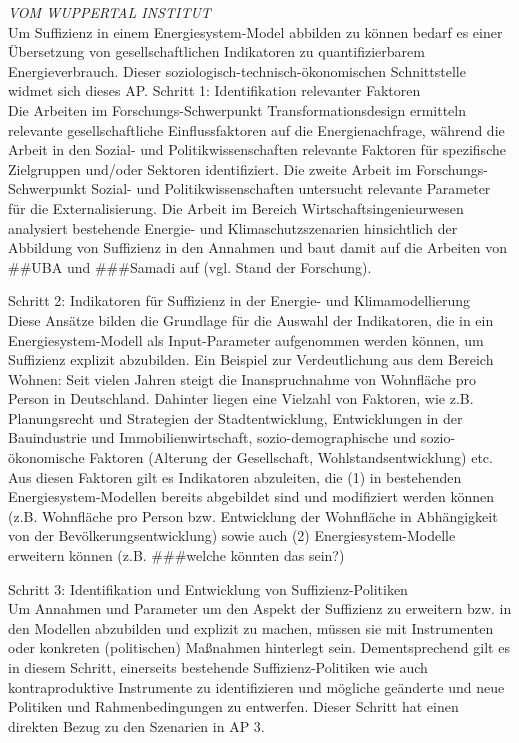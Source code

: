 \documentclass[a4paper,11pt,twoside]{scrartcl}
\begin{document}
\textit{VOM WUPPERTAL INSTITUT}\\
Um Suffizienz in einem Energiesystem-Model abbilden zu können bedarf es einer Übersetzung von gesellschaftlichen Indikatoren zu quantifizierbarem Energieverbrauch. Dieser soziologisch-technisch-ökonomischen Schnittstelle widmet sich dieses AP. 
Schritt 1: Identifikation relevanter Faktoren\\
Die Arbeiten im Forschungs-Schwerpunkt Transformationsdesign ermitteln relevante gesellschaftliche Einflussfaktoren auf die Energienachfrage, während die Arbeit in den Sozial- und Politikwissenschaften relevante Faktoren für spezifische Zielgruppen und/oder Sektoren identifiziert. Die zweite Arbeit im Forschungs-Schwerpunkt Sozial- und Politikwissenschaften untersucht relevante Parameter für die Externalisierung. Die Arbeit im Bereich Wirtschaftsingenieurwesen analysiert bestehende Energie- und Klimaschutzszenarien hinsichtlich der Abbildung von Suffizienz in den Annahmen und baut damit auf die Arbeiten von ##UBA und ###Samadi auf  (vgl. Stand der Forschung).

Schritt 2: Indikatoren für Suffizienz in der Energie- und Klimamodellierung\\
Diese Ansätze bilden die Grundlage für die Auswahl der Indikatoren, die in ein Energiesystem-Modell als Input-Parameter aufgenommen werden können, um Suffizienz explizit abzubilden.  
Ein Beispiel zur Verdeutlichung aus dem Bereich Wohnen: Seit vielen Jahren steigt die Inanspruchnahme von Wohnfläche pro Person in Deutschland. Dahinter liegen eine Vielzahl von Faktoren, wie z.B. Planungsrecht und Strategien der Stadtentwicklung, Entwicklungen in der Bauindustrie und Immobilienwirtschaft, sozio-demographische und sozio-ökonomische Faktoren (Alterung der Gesellschaft, Wohlstandsentwicklung) etc. 
Aus diesen Faktoren gilt es Indikatoren abzuleiten, die (1) in bestehenden Energiesystem-Modellen bereits abgebildet sind und modifiziert werden können (z.B. Wohnfläche pro Person bzw. Entwicklung der Wohnfläche in Abhängigkeit von der Bevölkerungsentwicklung) sowie auch (2) Energiesystem-Modelle erweitern können (z.B. ###welche könnten das sein?)

Schritt 3: Identifikation und Entwicklung von Suffizienz-Politiken \\
Um Annahmen und Parameter um den Aspekt der Suffizienz zu erweitern bzw. in den Modellen abzubilden und explizit zu machen, müssen sie mit Instrumenten oder konkreten (politischen) Maßnahmen hinterlegt sein. Dementsprechend gilt es in diesem Schritt, einerseits bestehende Suffizienz-Politiken wie auch kontraproduktive Instrumente zu identifizieren und mögliche geänderte und neue Politiken und Rahmenbedingungen zu entwerfen. Dieser Schritt hat einen direkten Bezug zu den Szenarien in AP 3.
\end{document}
